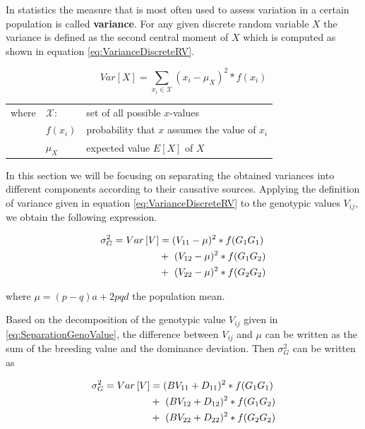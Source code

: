 \documentclass[]{book}
\theoremstyle{definition}
\theoremstyle{definition}
\theoremstyle{definition}
\theoremstyle{remark}
\begin{document}
In statistics the measure that is most often used to assess variation in a certain population is called \textbf{variance}. For any given discrete random variable \(X\) the variance is defined as the second central moment of \(X\) which is computed as shown in equation \eqref{eq:VarianceDiscreteRV}.

\begin{equation}
Var\left[X\right] = \sum_{x_i \in \mathcal{X}} (x_i - \mu_X)^2 * f(x_i)
\label{eq:VarianceDiscreteRV}
\end{equation}

\vspace*{1ex}

\begin{tabular}{p{1cm}p{1cm}p{6cm}}
  where & $\mathcal{X}$: &  set of all possible $x$-values\\
        & $f(x_i)$       &  probability that $x$ assumes the value of $x_i$ \\
        & $\mu_X $       &  expected value $E\left[X\right]$ of $X$
  \end{tabular}

\vspace*{2ex}

In this section we will be focusing on separating the obtained variances into different components according to their causative sources. Applying the definition of variance given in equation \eqref{eq:VarianceDiscreteRV} to the genotypic values \(V_{ij}\), we obtain the following expression.

\begin{align}
\sigma_G^2 = Var\left[V\right] &=   (V_{11} - \mu)^2 * f(G_1G_1) \notag \\
                               &  +\  (V_{12} - \mu)^2 * f(G_1G_2) \notag \\
                               &  +\  (V_{22} - \mu)^2 * f(G_2G_2)
\label{eq:VarianceGenotypicValue}
\end{align}

where \(\mu = (p - q)a + 2pqd\) the population mean.

Based on the decomposition of the genotypic value \(V_{ij}\) given in \eqref{eq:SeparationGenoValue}, the difference between \(V_{ij}\) and \(\mu\) can be written as the sum of the breeding value and the dominance deviation. Then \(\sigma_G^2\) can be written as

\begin{align}
\sigma_G^2 = Var\left[V\right] &=   (BV_{11} + D_{11})^2 * f(G_1G_1) \notag \\
                               &  +\  (BV_{12} + D_{12})^2 * f(G_1G_2) \notag \\
                               &  +\  (BV_{22} + D_{22})^2 * f(G_2G_2)
\label{eq:GeneticVarianceBVDom}
\end{align}
\end{document}
